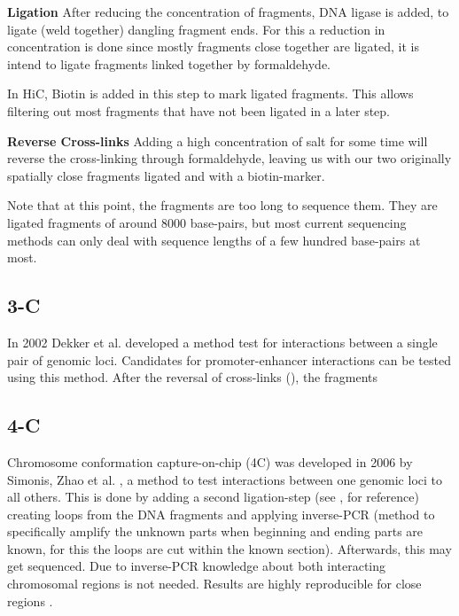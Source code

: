 \textbf{Ligation}\label{sec:ligation}
After reducing the concentration of fragments, DNA ligase is added, to ligate
(weld together) dangling fragment ends. For this a reduction in concentration
is done since mostly fragments close together are ligated, it is intend to
ligate fragments linked together by formaldehyde.

In HiC, Biotin is added in this step to mark ligated fragments. This allows
filtering out most fragments that have not been ligated in a later step.


\textbf{Reverse Cross-links}\label{sec:revcrosslink}
Adding a high concentration of salt for some time will reverse the
cross-linking through formaldehyde, leaving us with our two originally
spatially close fragments ligated and with a biotin-marker.

Note that at this point, the fragments are too long to sequence them.
They are ligated fragments of around 8000 base-pairs, but most current
sequencing methods can only deal with sequence lengths of a few hundred
base-pairs at most.




\subsection{3-C}\label{sec:3C}

In 2002 Dekker et al. \cite{dekker2002capturing} developed a method test for interactions
between a single pair of genomic loci. Candidates for promoter-enhancer
interactions can be tested using this method.
After the reversal of cross-links (), the fragments



\subsection{4-C}\label{sec:4C}

Chromosome conformation capture-on-chip (4C) was developed in 2006 by Simonis,
Zhao et al. \cite{simonis2006nuclear} \cite{zhao2006circular}, a method to test
interactions between one genomic loci to all others. This is done by adding a
second ligation-step (see ,  for
reference) creating loops from the DNA fragments and applying inverse-PCR
(method to specifically amplify the unknown parts when beginning and ending
parts are known, for this the loops are cut within the known section).
Afterwards, this may get sequenced. Due to inverse-PCR knowledge about both
interacting chromosomal regions is not needed.  Results are highly reproducible
for close regions .

